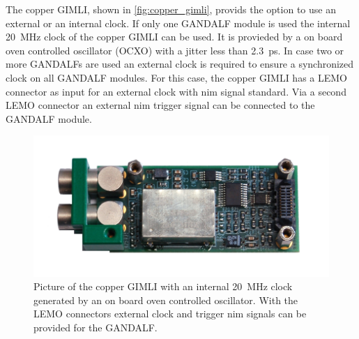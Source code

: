 The copper GIMLI, shown in \autoref{fig:copper_gimli}, provids the option to use an external or an internal clock.
If only one GANDALF module is used the internal \SI{20}{\mega\hertz} clock of the copper GIMLI can be used.
It is provieded by a on board oven controlled oscillator (OCXO) with a jitter less than \SI{2.3}{\pico\second}.
In case two or more GANDALFs are used an external clock is required to ensure a synchronized clock on all GANDALF modules.
For this case, the copper GIMLI has a LEMO connector as input for an external clock with \ac{nim} signal standard.
Via a second LEMO connector an external \ac{nim} trigger signal can be connected to the GANDALF module.

\begin{figure}
	\centering
	\includegraphics[width=.5\textwidth]{pictures/copper_gimli.png}
	\caption[Copper GIMLI]{Picture of the copper GIMLI with an internal \SI{20}{\mega\hertz} clock generated by an on board oven controlled oscillator. With the LEMO connectors external clock and trigger \ac{nim} signals can be provided for the GANDALF. \cite{herrmann}}
	\label{fig:copper_gimli}
\end{figure}



